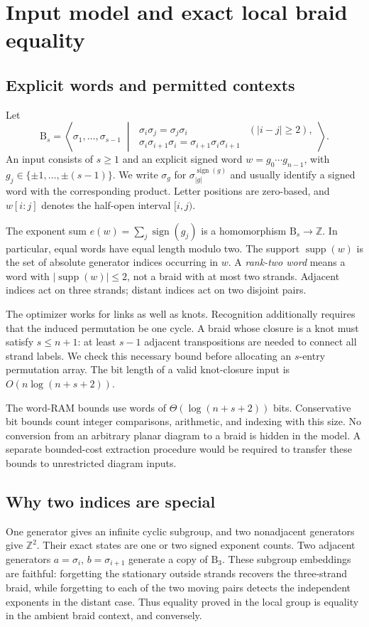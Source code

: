 \documentclass[11pt]{article}
\theoremstyle{definition}
\theoremstyle{remark}
\newcommand{\B}{\mathrm B}
\newcommand{\Z}{\mathbb Z}
\newcommand{\supp}{\operatorname{supp}}
\begin{document}
\section{Input model and exact local braid equality}
\subsection{Explicit words and permitted contexts}
Let
\[
 \B_s=\left\langle \sigma_1,\ldots,\sigma_{s-1}\;\middle|\;
 \begin{array}{ll}
 \sigma_i\sigma_j=\sigma_j\sigma_i&(|i-j|\ge2),\\
 \sigma_i\sigma_{i+1}\sigma_i=\sigma_{i+1}\sigma_i\sigma_{i+1}
 \end{array}\right\rangle .
\]
An input consists of $s\ge1$ and an explicit signed word
$w=g_0\cdots g_{n-1}$, with $g_j\in\{\pm1,\ldots,\pm(s-1)\}$.
We write $\sigma_{g}$ for $\sigma_{|g|}^{\operatorname{sign}(g)}$ and usually
identify a signed word with the corresponding product. Letter positions are
zero-based, and $w[i:j]$ denotes the half-open interval $[i,j)$.

The exponent sum $e(w)=\sum_j\operatorname{sign}(g_j)$ is a homomorphism
$\B_s\to\Z$. In particular, equal words have equal length modulo two.
The support $\supp(w)$ is the set of absolute generator indices occurring in
$w$. A \emph{rank-two word} means a word with $|\supp(w)|\le2$, not a braid
with at most two strands. Adjacent indices act on three strands; distant
indices act on two disjoint pairs.

The optimizer works for links as well as knots. Recognition additionally
requires that the induced permutation be one cycle. A braid whose closure is
a knot must satisfy $s\le n+1$: at least $s-1$ adjacent transpositions are
needed to connect all strand labels. We check this necessary bound before
allocating an $s$-entry permutation array. The bit length of a valid
knot-closure input is $O(n\log(n+s+2))$.

The word-RAM bounds use words of $\Theta(\log(n+s+2))$ bits. Conservative bit
bounds count integer comparisons, arithmetic, and indexing with this size.
No conversion from an arbitrary planar diagram to a braid is hidden in the
model. A separate bounded-cost extraction procedure would be required to
transfer these bounds to unrestricted diagram inputs.

\subsection{Why two indices are special}
One generator gives an infinite cyclic subgroup, and two nonadjacent
generators give $\Z^2$. Their exact states are one or two signed exponent
counts. Two adjacent generators $a=\sigma_i$, $b=\sigma_{i+1}$ generate a copy
of $\B_3$. These subgroup embeddings are faithful: forgetting the stationary
outside strands recovers the three-strand braid, while forgetting to each of
the two moving pairs detects the independent exponents in the distant case.
Thus equality proved in the local group is equality in the ambient braid
context, and conversely.
\end{document}

